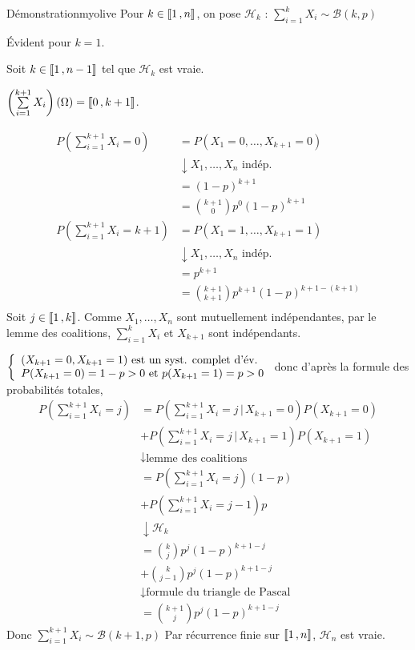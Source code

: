     \begin{demo}{Démonstration}{myolive}
        Pour $k \in \left\llbracket 1 \, , n \right\rrbracket$, on pose $\mathcal{H}_k$ : $\sum\limits_{i=1}^k X_i \sim \mathcal{B}(k,p)$
        
        Évident pour $k=1$.
        
        Soit $k \in \left\llbracket 1 \, , n-1 \right\rrbracket$ tel que $\mathcal{H}_k$ est vraie. 
        
        $\left( \sum\limits_{i=1}^{k+1} X_i \right)(\Omega) = \left\llbracket 0 \, , k+1 \right\rrbracket$.
        
        \begin{align*}
            P\left(\sum\limits_{i=1}^{k+1} X_i = 0\right) &= P(X_1 =0,\ldots,X_{k+1}=0) \\
            & \downarrow X_1,\ldots,X_n \text{ indép.} \\
            &= (1-p)^{k+1} \\
            &= \binom{k+1}{0} p^0 (1-p)^{k+1} \\
            P\left(\sum\limits_{i=1}^{k+1} X_i = k+1\right) &= P(X_1 =1,\ldots,X_{k+1}=1) \\
            & \downarrow X_1,\ldots,X_n \text{ indép.} \\
            &= p^{k+1} \\
            &= \binom{k+1}{k+1} p^{k+1} (1-p)^{k+1-(k+1)} \\
        \end{align*}
        Soit $j \in \left\llbracket 1 \, , k \right\rrbracket$. Comme $X_1,\ldots,X_n$ sont mutuellement indépendantes, par le lemme des coalitions, $\sum\limits_{i=1}^k X_i$ et $X_{k+1}$ sont indépendants.
        
        $\et{(X_{k+1}=0, X_{k+1}=1) \text{ est un syst. complet d’év.}}{P(X_{k+1}=0) = 1-p > 0 \text{ et } p(X_{k+1}=1) = p > 0}$ donc d’après la formule des probabilités totales, 
        \begin{align*}
            P\left(\sum\limits_{i=1}^{k+1} X_i = j\right) &=  P\left(\sum\limits_{i=1}^{k+1} X_i = j \, \big| \, X_{k+1} = 0\right) P(X_{k+1} = 0) \\
            &+ P\left(\sum\limits_{i=1}^{k+1} X_i = j \, \big| \, X_{k+1} = 1\right) P(X_{k+1} = 1) \\
            & \downarrow \text{lemme des coalitions} \\ 
            &= P\left(\sum\limits_{i=1}^{k+1} X_i = j\right) (1-p) \\
            & + P\left(\sum\limits_{i=1}^{k+1} X_i = j-1 \right) p \\
            & \downarrow \mathcal{H}_k \\
            &= \binom{k}{j} p^j (1-p)^{k+1-j} \\
            &+ \binom{k}{j-1}p^j (1-p)^{k+1-j} \\
            & \downarrow \text{formule du triangle de Pascal}  \\
            &= \binom{k+1}{j} p^j (1-p)^{k+1-j} 
        \end{align*}
        Donc $\sum\limits_{i=1}^{k+1} X_i \sim \mathcal{B}(k+1,p)$
        Par récurrence finie sur $\left\llbracket 1 \, , n \right\rrbracket$, $\mathcal{H}_n$ est vraie.
    \end{demo}

